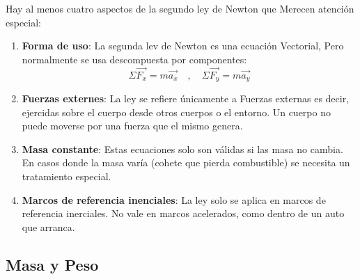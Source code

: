 \documentclass{article}
\newcommand{\newsubsection}[1]{
    \subsection{\color{sectionColor} #1}
}
\newcommand{\bl}[1]{\textbf{#1}}
\begin{document}
    \par Hay al menos cuatro aspectos de la segundo ley de Newton que Merecen atención especial:

    \begin{enumerate}
        \item \bl{Forma de uso}: La segunda lev de Newton es una ecuación Vectorial, Pero normalmente se usa descompuesta por componentes:
        \[\Sigma \vec{F_x} = m \vec{a_x} \quad , \quad \Sigma \vec{F_y} = m \vec{a_y}\]

        \item \bl{Fuerzas externes}: La ley se refiere únicamente a Fuerzas externas es decir, ejercidas sobre el cuerpo desde otros cuerpos o el entorno. Un cuerpo no puede moverse por una fuerza que el mismo genera.
        \item \bl{Masa constante}: Estas ecuaciones solo son válidas si las masa no cambia. En casos donde la masa varía (cohete que pierda combustible) se necesita un tratamiento especial.
        \item \bl{Marcos de referencia inenciales}: La ley solo se aplica en marcos de referencia inerciales. No vale en marcos acelerados, como dentro de un auto que arranca.
    \end{enumerate}

    \newsubsection{Masa y Peso}
\end{document}
